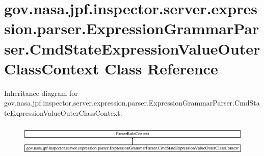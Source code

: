 \hypertarget{classgov_1_1nasa_1_1jpf_1_1inspector_1_1server_1_1expression_1_1parser_1_1_expression_grammar_paa97aac802c11881ff9166c765f4fc61a}{}\section{gov.\+nasa.\+jpf.\+inspector.\+server.\+expression.\+parser.\+Expression\+Grammar\+Parser.\+Cmd\+State\+Expression\+Value\+Outer\+Class\+Context Class Reference}
\label{classgov_1_1nasa_1_1jpf_1_1inspector_1_1server_1_1expression_1_1parser_1_1_expression_grammar_paa97aac802c11881ff9166c765f4fc61a}
Inheritance diagram for gov.\+nasa.\+jpf.\+inspector.\+server.\+expression.\+parser.\+Expression\+Grammar\+Parser.\+Cmd\+State\+Expression\+Value\+Outer\+Class\+Context\+:\begin{figure}[H]
\begin{center}
\leavevmode
\includegraphics[height=1.588652cm]{classgov_1_1nasa_1_1jpf_1_1inspector_1_1server_1_1expression_1_1parser_1_1_expression_grammar_paa97aac802c11881ff9166c765f4fc61a}
\end{center}
\end{figure}
